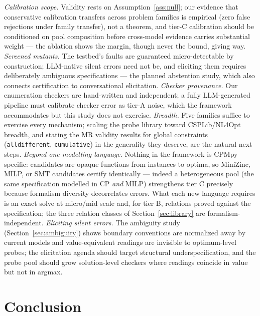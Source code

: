 \documentclass[pdflatex,sn-mathphys-num]{sn-jnl}
\theoremstyle{thmstyleone}
\theoremstyle{thmstyletwo}
\begin{document}
\emph{Calibration scope.} Validity rests on
Assumption~\ref{ass:null}; our evidence that conservative calibration
transfers across problem families is empirical (zero false rejections
under family transfer), not a theorem, and tier-C calibration should
be conditioned on pool composition before cross-model evidence
carries substantial weight --- the ablation shows the margin, though
never the bound, giving way. \emph{Screened mutants.} The testbed's
faults are guaranteed micro-detectable by construction; LLM-native
silent errors need not be, and eliciting them requires deliberately
ambiguous specifications --- the planned abstention study, which also
connects certification to conversational elicitation. \emph{Checker
provenance.} Our enumeration checkers are hand-written and
independent; a fully LLM-generated pipeline must calibrate
checker error as tier-A noise, which the framework accommodates but
this study does not exercise. \emph{Breadth.} Five families suffice
to exercise every mechanism; scaling the probe library toward
CSPLib/NL4Opt breadth, and stating the MR validity results for global
constraints (\texttt{alldifferent}, \texttt{cumulative}) in the
generality they deserve, are the natural next steps.
\emph{Beyond one modelling language.} Nothing in the framework is
CPMpy-specific: candidates are opaque functions from instances to
optima, so MiniZinc, MILP, or SMT candidates certify identically ---
indeed a heterogeneous pool (the same specification modelled in CP
\emph{and} MILP) strengthens tier C precisely because formalism
diversity decorrelates errors. What each new language requires is an
exact solve at micro/mid scale and, for tier B, relations proved
against the specification; the three relation classes of
Section~\ref{sec:library} are formalism-independent.
\emph{Eliciting silent errors.} The ambiguity study
(Section~\ref{sec:ambiguity}) shows boundary conventions are
normalized away by current models and value-equivalent readings are
invisible to optimum-level probes; the elicitation agenda should
target structural underspecification, and the probe pool should grow
solution-level checkers where readings coincide in value but not in
argmax.

\section{Conclusion}\label{sec:conclusion}
\end{document}
